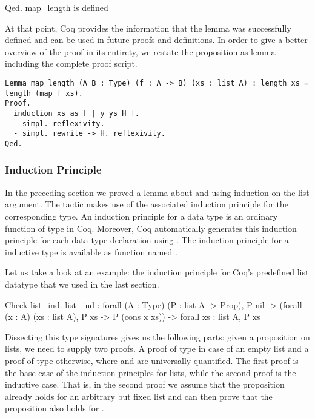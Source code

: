 \begin{cproof}{Qed.}
map_length is defined
\end{cproof}

At that point, Coq provides the information that the lemma  was successfully defined and can be used in future proofs and definitions.
In order to give a better overview of the proof in its entirety, we restate the proposition as lemma including the complete proof script.

\begin{verbatim}
Lemma map_length (A B : Type) (f : A -> B) (xs : list A) : length xs = length (map f xs).
Proof.
  induction xs as [ | y ys H ].
  - simpl. reflexivity.
  - simpl. rewrite -> H. reflexivity.
Qed.
\end{verbatim}

\subsubsection{Induction Principle}
\label{subsub:induction}

In the preceding section we proved a lemma about  and  using induction on the list argument.
The  tactic makes use of the associated induction principle for the corresponding type.
An induction principle for a data type is an ordinary function of type  in Coq.
Moreover, Coq automatically generates this induction principle for each data type declaration using .
The induction principle for a inductive type  is available as function named .

Let us take a look at an example: the induction principle for Coq's predefined list datatype that we used in the last section.

\begin{crepl}
\coqrepl Check list_ind.
  list_ind : forall (A : Type) (P : list A -> Prop),
    P nil ->
    (forall (x : A) (xs : list A), P xs -> P (cons x xs)) ->
    forall xs : list A, P xs
\end{crepl}

Dissecting this type signatures gives us the following parts: given a proposition  on lists, we need to supply two proofs.
A proof of type  in case of an empty list and a proof of type  otherwise, where  and  are universally quantified.
The first proof is the base case of the induction principles for lists, while the second proof is the inductive case.
That is, in the second proof we assume that the proposition already holds for an arbitrary but fixed list  and can then prove that the proposition also holds for .

